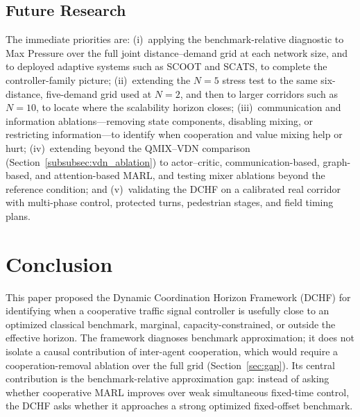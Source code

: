 \documentclass[review,12pt]{elsarticle}
\begin{document}
\subsection{Future Research}
\label{sec:future_roadmap}

The immediate priorities are: (i)~applying the benchmark-relative diagnostic to Max Pressure over the full joint distance--demand grid at each network size, and to deployed adaptive systems such as SCOOT and SCATS, to complete the controller-family picture; (ii)~extending the $N=5$ stress test to the same six-distance, five-demand grid used at $N=2$, and then to larger corridors such as $N=10$, to locate where the scalability horizon closes; (iii)~communication and information ablations---removing state components, disabling mixing, or restricting information---to identify when cooperation and value mixing help or hurt; (iv)~extending beyond the QMIX--VDN comparison (Section~\ref{subsubsec:vdn_ablation}) to actor--critic, communication-based, graph-based, and attention-based MARL, and testing mixer ablations beyond the reference condition; and (v)~validating the DCHF on a calibrated real corridor with multi-phase control, protected turns, pedestrian stages, and field timing plans.

\section{Conclusion}
\label{sec:conclusion}

This paper proposed the Dynamic Coordination Horizon Framework (DCHF) for identifying when a cooperative traffic signal controller is usefully close to an optimized classical benchmark, marginal, capacity-constrained, or outside the effective horizon. The framework diagnoses benchmark approximation; it does not isolate a causal contribution of inter-agent cooperation, which would require a cooperation-removal ablation over the full grid (Section~\ref{sec:gap}). Its central contribution is the benchmark-relative approximation gap: instead of asking whether cooperative MARL improves over weak simultaneous fixed-time control, the DCHF asks whether it approaches a strong optimized fixed-offset benchmark.
\end{document}
